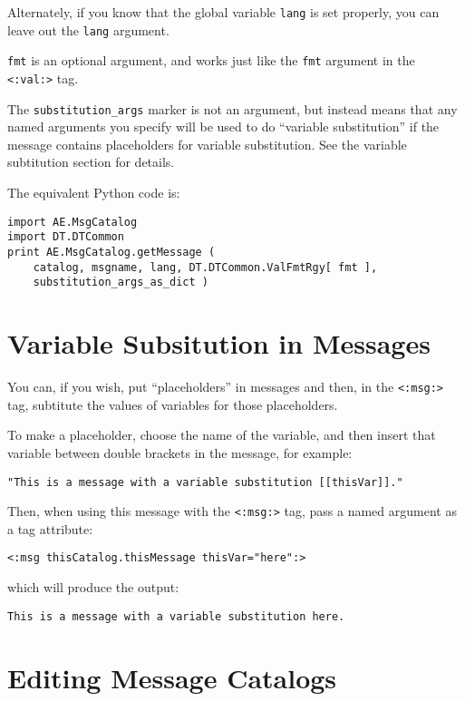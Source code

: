 \documentclass{manual}
\begin{document}
Alternately, if you know that the global variable \texttt{lang}
is set properly, you can leave out the \texttt{lang} argument.

\texttt{fmt} is an optional argument, and works just like 
the \texttt{fmt} argument in the 
\texttt{<:val:>} 
tag.

The \texttt{substitution_args} marker is not an argument, but instead
means that any named arguments you specify will be used to do
``variable substitution'' if the message contains placeholders
for variable substitution. See the 
variable subtitution 
section for details.

The equivalent Python code is:
\begin{verbatim}
import AE.MsgCatalog
import DT.DTCommon
print AE.MsgCatalog.getMessage ( 
    catalog, msgname, lang, DT.DTCommon.ValFmtRgy[ fmt ], 
    substitution_args_as_dict )
\end{verbatim}


\section{Variable Subsitution in Messages}
\label{msgcatvarsub}

You can, if you wish, put ``placeholders'' in
messages and then, in the 
\texttt{<:msg:>} 
tag, subtitute the values of variables for those
placeholders.

To make a placeholder, choose the name of the variable, 
and then insert that variable between double brackets in
the message, for example:

\begin{verbatim}
"This is a message with a variable substitution [[thisVar]]."
\end{verbatim}

Then, when using this message with the
\texttt{<:msg:>} 
tag, pass a named argument as a tag attribute:

\begin{verbatim}
<:msg thisCatalog.thisMessage thisVar="here":>
\end{verbatim}

which will produce the output:

\begin{verbatim}
This is a message with a variable substitution here.
\end{verbatim}


\section{Editing Message Catalogs}
\label{msgcatedit}
\end{document}
